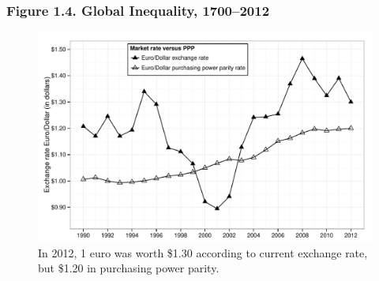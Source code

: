 \documentclass[t]{beamer}\usepackage[]{graphicx}\usepackage[]{color}
\newenvironment{knitrout}{}{} %
\begin{document}
\begin{frame}[label=Figure_1_4,fragile]
\frametitle{Figure 1.4. Global Inequality, 1700--2012}
\begin{figure}[t]
\begin{minipage}[b]{\textwidth}
\centering
\begin{knitrout}\footnotesize
{}\color{fgcolor}

{\centering \includegraphics[width=1\linewidth]{figures/bw/Figure_1_4} 

}



\end{knitrout}
\caption{In 2012, 1 euro was worth \$1.30 according to current exchange rate, but \$1.20 in purchasing power parity.}
\end{minipage}
\end{figure}
\end{frame}
\end{document}
